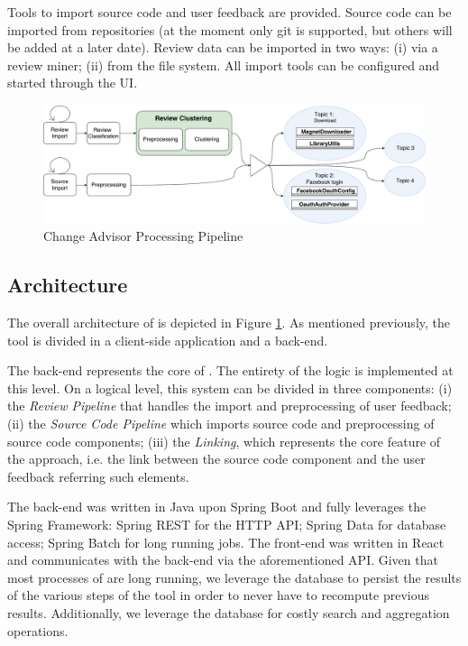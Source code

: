 Tools to import source code and user feedback are provided. Source code can be imported from repositories (at the moment only git is supported, but others will be added at a later date). Review data can be imported in two ways: (i) via a review miner; (ii) from the file system. All import tools can be configured and started through the UI.

%
%
\begin{figure}[!h]
    \centering
    \includegraphics[scale=0.3]{imgs/ChangeAdvisorPipeline.pdf}
    \caption{Change Advisor Processing Pipeline}
    	\label{fig:architecture}
\end{figure}

\subsection{\tool{} Architecture}
The overall architecture of \tool{} is depicted in Figure \ref{fig:architecture}.
As mentioned previously, the tool is divided in a client-side application and a back-end.

The back-end represents the core of \tool{}. The entirety of the logic is implemented at this level. On a logical level, this system can be divided in three components: (i) the \textit{Review Pipeline} that handles the import and preprocessing of user feedback; (ii) the \textit{Source Code Pipeline} which imports source code and preprocessing of source code components; (iii) the \textit{Linking}, which represents the core feature of the \tool{} approach, i.e. the link between the source code component and the user feedback referring such elements.



The back-end was written in Java upon Spring Boot and fully leverages the Spring Framework: Spring REST for the HTTP API; Spring Data for database access; Spring Batch for long running jobs. 
The front-end was written in React and communicates with the back-end via the aforementioned API.
Given that most processes of \tool{} are long running, we leverage the database to persist the results of the various steps of the tool in order to never have to recompute previous results. Additionally, we leverage the database for costly search and aggregation operations.

